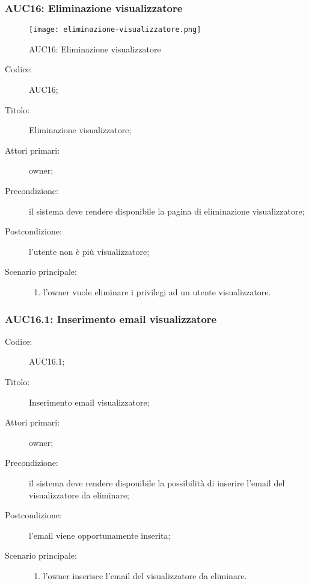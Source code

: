 \documentclass[../../../analisi-dei-requisiti.tex]{subfiles}
\begin{document}
\subsubsection{AUC16: Eliminazione visualizzatore}%
\label{subs:AUC16}

\begin{figure}[H]
  \centering
  \texttt{[image: eliminazione-visualizzatore.png]}
  \caption{AUC16: Eliminazione visualizzatore}%
  \label{fig:AUC16}
\end{figure}

\begin{description}
  \item[Codice:] AUC16;
  \item[Titolo:] Eliminazione visualizzatore;
  \item[Attori primari:] owner;
  \item[Precondizione:] il sistema deve rendere disponibile la pagina di eliminazione visualizzatore;
  \item[Postcondizione:] l'utente non è più visualizzatore;
  \item[Scenario principale:]
        \begin{enumerate}
          \item l'owner vuole eliminare i privilegi ad un utente visualizzatore.
        \end{enumerate}
\end{description}

\subsubsection{AUC16.1: Inserimento email visualizzatore}%
\label{subs:AUC16.1}
\begin{description}
  \item[Codice:] AUC16.1;
  \item[Titolo:] Inserimento email visualizzatore;
  \item[Attori primari:] owner;
  \item[Precondizione:] il sistema deve rendere disponibile la possibilità di inserire l'email del visualizzatore da eliminare;
  \item[Postcondizione:] l'email viene opportunamente inserita;
  \item[Scenario principale:]
        \begin{enumerate}
          \item l'owner inserisce l'email del visualizzatore da eliminare.
        \end{enumerate}
\end{description}
\end{document}
